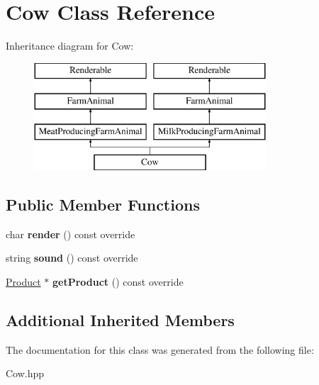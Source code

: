 \hypertarget{class_cow}{}\section{Cow Class Reference}
\label{class_cow}
Inheritance diagram for Cow\+:\begin{figure}[H]
\begin{center}
\leavevmode
\includegraphics[height=4.000000cm]{class_cow}
\end{center}
\end{figure}
\subsection*{Public Member Functions}
\begin{DoxyCompactItemize}
\item 
\mbox{\label{class_cow_abbe6d9b43db5fbf3f625476f5f77e1f3}} 
char {\bfseries render} () const override
\item 
\mbox{\label{class_cow_ae70afcf5819c61b8f761dd0e915cea20}} 
string {\bfseries sound} () const override
\item 
\mbox{\label{class_cow_aa8da6e5254ba73d3a13d05b7ede7f007}} 
\mbox{\hyperlink{class_product}{Product}} $\ast$ {\bfseries get\+Product} () const override
\end{DoxyCompactItemize}
\subsection*{Additional Inherited Members}


The documentation for this class was generated from the following file\+:\begin{DoxyCompactItemize}
\item 
Cow.\+hpp\end{DoxyCompactItemize}
